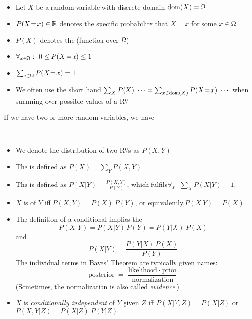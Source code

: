 \begin{myDefinition} ~\\[-5ex]
\renewcommand{\=}{\!=\!}
\begin{itemize}
\item  Let $X$ be a random variable with discrete domain ${\rm dom}(X)
= \Omega$
\item $P(X\=x) \in \RRR$ denotes the specific probability that $X=x$
for some $x\in\Omega$
\item $P(X)$ denotes the  (function over $\Omega$)
\item $\forall_{x\in\O}:~ 0\le P(X\=x) \le 1$
\item $\sum_{x \in \O} P(X\=x) = 1$
\item We often use the short hand $\sum_X P(X)~ \cdots
= \sum_{x\in\dom(X)} P(X\=x)~ \cdots$ when summing over possible
values of a RV
\end{itemize}
\end{myDefinition}

If we have two or more random variables, we have
\begin{myDefinition}~\\[-5ex]
\begin{itemize}
\item We denote the  distribution of two RVs as $P(X,Y)$
\item The  is defined as $P(X) = \sum_Y P(X,Y)$
\item The  is defined as $P(X|Y)
= \frac{P(X,Y)}{P(Y)}$, which fulfils\newline $\forall_Y:~ \sum_X P(X|Y) = 1$.
\item $X$ is  of $Y$ iff $P(X,Y) = P(X)~ P(Y)$, or
equivalently,\newline $P(X|Y) = P(X)$.
\item The definition of a conditional implies the 
\begin{equation}
P(X,Y) = P(X|Y)~ P(Y) = P(Y|X)~ P(X)
\end{equation}
and 
\begin{equation}
P(X|Y) = \frac{P(Y|X)~ P(X)}{P(Y)} 
\end{equation}
The individual terms in Bayes' Theorem are typically given names:
\begin{equation}
\text{posterior} ~=~
\frac{\text{likelihood} ~\cdot~ \text{prior}}{\text{normalization}}
\end{equation}
(Sometimes, the normalization is also called \emph{evidence}.)
\item $X$ is \emph{conditionally independent} of $Y$ given $Z$ iff $P(X|Y,Z)
 = P(X|Z)$ or $P(X,Y|Z) = P(X|Z)~ P(Y|Z)$
\end{itemize}
\end{myDefinition}

